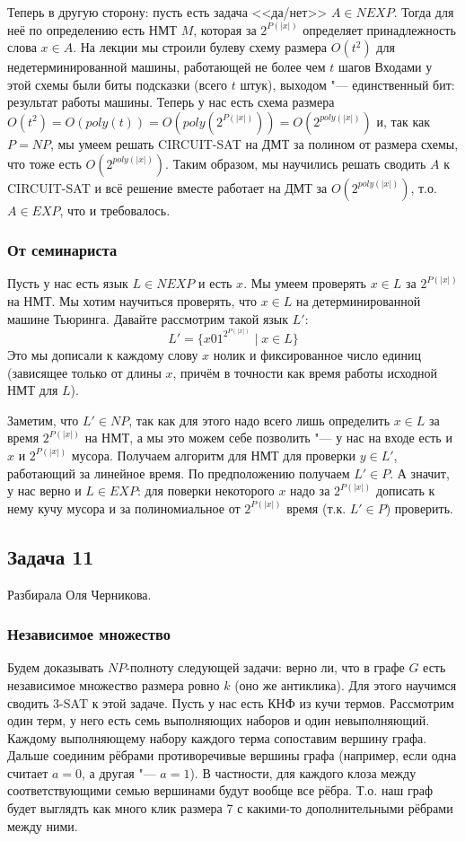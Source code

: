 		Теперь в другую сторону: пусть есть задача <<да/нет>> $A \in NEXP$.
		Тогда для неё по определению есть НМТ $M$, которая за $2^{P(|x|)}$ определяет
		принадлежность слова $x \in A$.
		На лекции мы строили булеву схему размера $O(t^2)$ для недетерминированной машины, работающей не более чем $t$ шагов
		Входами у этой схемы были биты подсказки (всего $t$ штук), выходом "--- единственный бит: результат работы машины.
		Теперь у нас есть схема размера $O(t^2)=O(poly(t))=O(poly(2^{P(|x|)}))=O(2^{poly(|x|)})$ и,
		так как $P=NP$, мы умеем решать CIRCUIT-SAT на ДМТ за полином от размера схемы, что тоже есть $O(2^{poly(|x|)})$.
		Таким образом, мы научились решать сводить $A$ к CIRCUIT-SAT и всё решение вместе работает на ДМТ
		за $O(2^{poly(|x|)})$, т.о. $A \in EXP$, что и требовалось.

	\subsubsection{От семинариста}\label{prob13_sol2}
		Пусть у нас есть язык $L \in NEXP$ и есть $x$.
		Мы умеем проверять $x \in L$ за $2^{P(|x|)}$ на НМТ.
		Мы хотим научиться проверять, что $x\in L$ на детерминированной машине Тьюринга.
		Давайте рассмотрим такой язык $L'$:
		\[ L' = \{ x 0 1^{2^{P(|x|)}} \mid x \in L \} \]
		Это мы дописали к каждому слову $x$ нолик и фиксированное число единиц (зависящее только от длины $x$,
		причём в точности как время работы исходной НМТ для $L$).

		Заметим, что $L' \in NP$, так как для этого надо всего лишь определить
		$x \in L$ за время $2^{P(|x|)}$ на НМТ, а мы это можем себе позволить "--- у нас на входе
		есть и $x$ и $2^{P(|x|)}$ мусора.
		Получаем алгоритм для НМТ для проверки $y \in L'$, работающий за линейное время.
		По предположению получаем $L' \in P$.
		А значит, у нас верно и $L \in EXP$: для поверки некоторого $x$ надо за $2^{P(|x|)}$ дописать
		к нему кучу мусора и за полиномиальное от $2^{P(|x|)}$ время (т.к. $L' \in P$) проверить.

\subsection{Задача 11}
	Разбирала Оля Черникова.

	\subsubsection{Независимое множество}
		Будем доказывать $NP$-полноту следующей задачи: верно ли, что в графе $G$ есть независимое множество размера ровно $k$ (оно же антиклика).
		Для этого научимся сводить 3-SAT к этой задаче.
		Пусть у нас есть КНФ из кучи термов.
		Рассмотрим один терм, у него есть семь выполняющих наборов и один невыполняющий.
		Каждому выполняющему набору каждого терма сопоставим вершину графа.
		Дальше соединим рёбрами противоречивые вершины графа (например, если одна считает $a=0$, а другая "--- $a=1$).
		В частности, для каждого клоза между соответствующими семью вершинами будут вообще все рёбра.
		Т.о. наш граф будет выглядть как много клик размера 7 с какими-то дополнительными рёбрами между ними.

